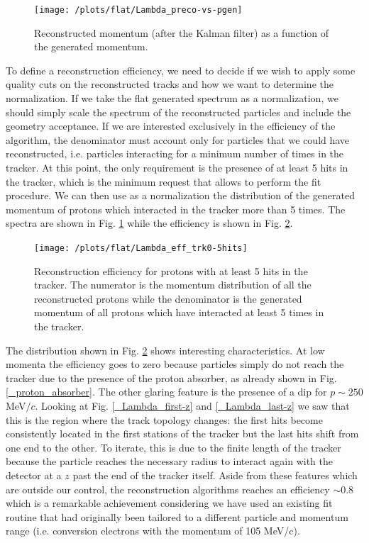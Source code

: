 \documentclass[12pt,a4paper,openright, oneside, titlepage]{book} %
\begin{document}
\begin{figure}[!htb]
\centering
\texttt{[image: /plots/flat/Lambda\_preco-vs-pgen]}
\caption[Reconstructed vs generated momentum (flat protons)]
{Reconstructed momentum (after the Kalman filter) as a function of the generated momentum.}
\label{_Lambda_preco-vs-pgen}
\end{figure}

\noindent To define a reconstruction efficiency, 
we need to decide if we wish to apply some quality cuts 
on the reconstructed tracks and how we want to determine the normalization. 
If we take the flat generated spectrum as a normalization, 
we should simply scale the spectrum of the reconstructed particles 
and include the geometry acceptance. 
If we are interested exclusively in the efficiency of the algorithm, 
the denominator must account only for particles that we could have reconstructed, 
i.e. particles interacting for a minimum number of times in the tracker. 
At this point, the only requirement is the presence of at least 5 hits in the tracker, 
which is the minimum request that allows to perform the fit procedure. 
We can then use as a normalization the distribution of the generated momentum 
of protons which interacted in the tracker more than 5 times. 
The spectra are shown in Fig. \ref{_Lambda_preco-vs-pgen} 
while the efficiency is shown in Fig. \ref{_Lambda_eff_trk0-5hits}.\\

\begin{figure}[!htb]
\centering
\texttt{[image: /plots/flat/Lambda\_eff\_trk0-5hits]}
\caption[Algorithm efficiency]{Reconstruction efficiency for protons with at least 5 hits in the tracker. 
The numerator is the momentum distribution of all the reconstructed protons
while the denominator is the generated momentum of all protons which have
interacted at least 5 times in the tracker.}
\label{_Lambda_eff_trk0-5hits}
\end{figure}

\noindent The distribution shown in Fig. \ref{_Lambda_eff_trk0-5hits} shows interesting characteristics. 
At low momenta the efficiency goes to zero because particles simply do not reach the tracker 
due to the presence of the proton absorber, as already shown in Fig. \ref{_proton_absorber}. 
The other glaring feature is the presence of a dip for $p\sim250$ MeV$/c$. 
Looking at Fig. \ref{_Lambda_first-z} and \ref{_Lambda_last-z} 
we saw that this is the region where the track topology changes: 
the first hits become consistently located in the first stations of the tracker 
but the last hits shift from one end to the other. 
To iterate, this is due to the finite length of the tracker because the particle reaches 
the necessary radius to interact again with the detector at a $z$ past the end of the tracker itself.
Aside from these features which are outside our control, 
the reconstruction algorithms reaches an efficiency $\sim 0.8$ 
which is a remarkable achievement considering we have used an existing fit routine 
that had originally been tailored to a different particle and momentum range
(i.e. conversion electrons with the momentum of 105 MeV/c).\\
\end{document}
